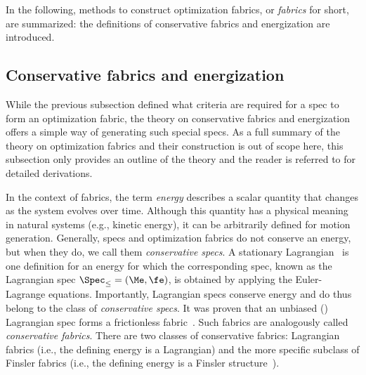 In the following, methods to construct optimization fabrics, or \textit{fabrics} for
short, are summarized: the definitions of conservative fabrics and energization are
introduced.

\subsection{Conservative fabrics and energization}%
\label{sub:conservative_fabrics_and_energization}

While the previous subsection defined what criteria are required for a spec to form
an optimization fabric, the theory on conservative fabrics and energization 
offers a simple way of generating such special specs. As a full summary of the theory
on optimization fabrics and their construction is out of scope here, this
subsection only provides an outline of the theory and the reader is referred to 
\cite{Ratliff2021,Wyk2022} for detailed derivations.

In the context of fabrics, the term \textit{energy} describes a scalar quantity that
changes as the system evolves over time.  Although this quantity has a physical meaning in
natural systems (e.g., kinetic energy), it can be arbitrarily defined for motion generation.
Generally, specs and optimization fabrics do not conserve an energy, but when they do, we
call them \textit{conservative specs}.  A stationary Lagrangian~\cite[Definition
4.11]{Ratliff2020} is one definition for an energy for which the corresponding spec, known
as the Lagrangian spec $\Spec_{\le} = \left(\Me,\fe\right)$, is obtained by applying the
Euler-Lagrange equations. Importantly, Lagrangian specs conserve energy and do thus belong
to the class of \textit{conservative specs}.  It was proven that an unbiased
(\cite[Definition~4.11]{Ratliff2020}) Lagrangian spec forms a frictionless
fabric~\cite[Proposition~4.18]{Ratliff2020}. Such fabrics are analogously called
\textit{conservative fabrics}.  There are two classes of conservative fabrics: Lagrangian
fabrics (i.e., the defining energy is a Lagrangian) and the more specific subclass of
Finsler fabrics (i.e., the
defining energy is a Finsler structure~\cite[Definition 5.4]{Ratliff2020}). 

